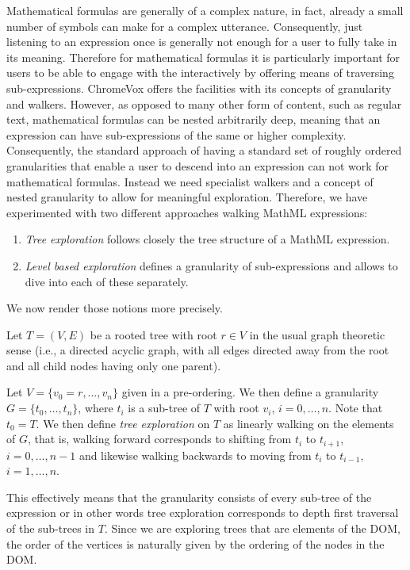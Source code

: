 \documentclass{sig-alternate}
\begin{document}
Mathematical formulas are generally of a complex nature, in fact, already a
small number of symbols can make for a complex utterance.  Consequently, just
listening to an expression once is generally not enough for a user to fully take
in its meaning.  Therefore for mathematical formulas it is particularly
important for users to be able to engage with the interactively by offering
means of traversing sub-expressions.  ChromeVox offers the facilities with its
concepts of granularity and walkers. However, as opposed to many other form of
content, such as regular text, mathematical formulas can be nested arbitrarily
deep, meaning that an expression can have sub-expressions of the same or higher
complexity. Consequently, the standard approach of having a standard set of
roughly ordered granularities that enable a user to descend into an expression
can not work for mathematical formulas. Instead we need specialist walkers and a
concept of nested granularity to allow for meaningful exploration. Therefore,
we have experimented with two different approaches walking MathML expressions:
\begin{enumerate}[(1)]
\item \emph{Tree exploration} follows closely the tree structure of a MathML expression.
\item \emph{Level based exploration} defines a granularity of
  sub-ex\-pressions and allows to dive into each of these separately.
\end{enumerate}
We now render those notions more precisely.

Let $T=(V,E)$ be a rooted tree with root $r\in V$ in the usual graph theoretic
sense (i.e., a directed acyclic graph, with all edges directed away from the
root and all child nodes having only one parent). 

Let $V=\{v_0=r,\ldots,v_n\}$ given in a pre-ordering. We then define a
granularity $G=\{t_0,\ldots, t_n\}$, where $t_i$ is a sub-tree of $T$ with root
$v_i$, $i=0,\ldots,n$. Note that $t_0=T$. We then define \emph{tree exploration}
on $T$ as linearly walking on the elements of $G$, that is, walking forward
corresponds to shifting from $t_i$ to $t_{i+1}$, $i=0,\ldots,n-1$ and likewise
walking backwards to moving from $t_i$ to $t_{i-1}$, $i=1,\ldots, n$.

This effectively means that the granularity consists of every sub-tree of the
expression or in other words tree exploration corresponds to depth first
traversal of the sub-trees in $T$. Since we are exploring trees that are
elements of the DOM, the order of the vertices is naturally given by the
ordering of the nodes in the DOM.
\end{document}
